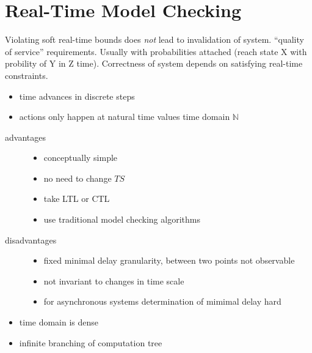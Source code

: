 \documentclass[a4paper, 10pt]{article}
\begin{document}
\section{Real-Time Model Checking}

\begin{mdframed}[roundcorner=5pt,
subtitlebelowline=false,subtitleaboveline=false,
subtitlebackgroundcolor=blue!30,
frametitlerule=true,
frametitlebackgroundcolor=blue!30,
frametitle={soft real-time systems}
]
Violating soft real-time bounds does \emph{not} lead to invalidation of system. \follows ``quality of service'' requirements. Usually with probabilities attached (reach state X with probility of Y in Z time).
Correctness of system depends on satisfying real-time constraints.
\begin{itemize}
    \item time advances in discrete steps
    \item actions only happen at natural time values \follows time domain $\mathds{N}$
\end{itemize}
\begin{description}
    \item[advantages]
    \begin{itemize}
        \item conceptually simple
        \item no need to change $TS$
        \item take LTL or CTL
        \item use traditional model checking algorithms
    \end{itemize}
    \item[disadvantages]
    \begin{itemize}
        \item fixed minimal delay granularity, between two points not observable
        \item not invariant to changes in time scale
        \item for asynchronous systems determination of mimimal delay hard
    \end{itemize}
\end{description}
\begin{itemize}
    \item time domain is dense
    \item infinite branching of computation tree
\end{itemize}
\begin{itemize}

\end{itemize}
\end{mdframed}
\end{document}
